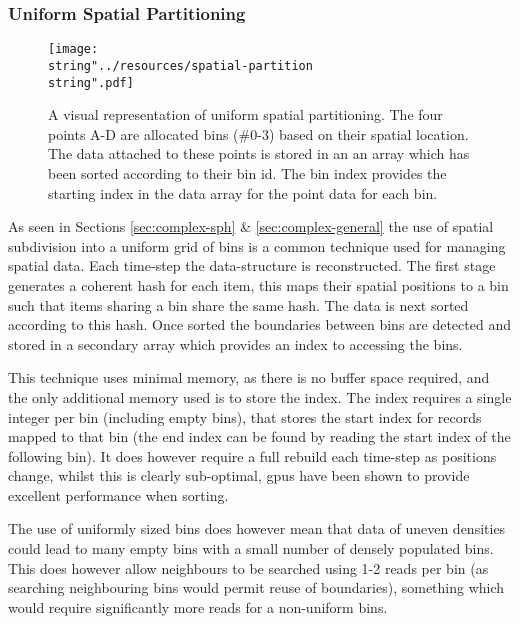     \subsubsection*{Uniform Spatial Partitioning\label{sub:spatial-partitioning}}
\begin{wrapfigure}{O}{0.5\columnwidth}%
  \begin{centering}
  \texttt{[image: \\string"../resources/spatial-partition\\string".pdf]}
  \par\end{centering}
  \protect\caption[A visual representation of uniform spatial partitioning.]{\label{fig:spatial-partitioning}A visual representation of uniform spatial partitioning. The four points A-D are allocated bins (\#0-3) based on their spatial location. The data attached to these points is stored in an an array which has been sorted according to their bin id. The bin index provides the starting index in the data array for the point data for each bin.}
\end{wrapfigure}%
      As seen in Sections \ref{sec:complex-sph} \& \ref{sec:complex-general} the use of spatial subdivision into a uniform grid of bins is a common technique used for managing spatial data.
      Each time-step the data-structure is reconstructed. The first stage generates a coherent hash for each item, this maps their spatial positions to a bin such that items sharing a bin share the same hash. The data is next sorted according to this hash. Once sorted the boundaries between bins are detected and stored in a secondary array which provides an index to accessing the bins.
      
      This technique uses minimal memory, as there is no buffer space required, and the only additional memory used is to store the index. The index requires a single integer per bin (including empty bins), that stores the start index for records mapped to that bin (the end index can be found by reading the start index of the following bin). It does however require a full rebuild each time-step as positions change, whilst this is clearly sub-optimal, \glspl{gpu} have been shown to provide excellent performance when sorting.
      
      The use of uniformly sized bins does however mean that data of uneven densities could lead to many empty bins with a small number of densely populated bins. This does however allow neighbours to be searched using 1-2 reads per bin (as searching neighbouring bins would permit reuse of boundaries), something which would require significantly more reads for a non-uniform bins.
              
